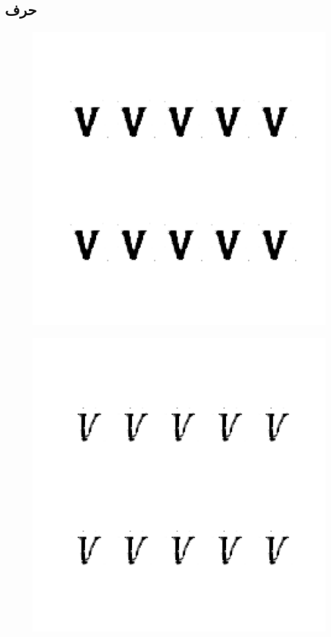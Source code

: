 \documentclass{article}
\begin{document}
\subsection{حرف }
\begin{figure}[H]
	\centerline{\includegraphics[width=\textwidth , height=\textheight ]{../results/CGAN_Adam/figs/letters/V/95.pdf}}
\end{figure}
\begin{figure}[H]
	\centerline{\includegraphics[width=\textwidth , height=\textheight ]{../results/CGAN_Adam/figs/letters/V/90.pdf}}
\end{figure}
\end{document}
